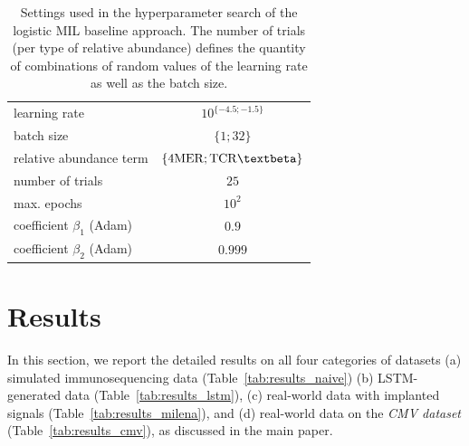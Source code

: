 \documentclass[oneside]{book}
\begin{document}
\begin{table}[htp]%
    \begin{center}%
        \begin{tabular}{lc}%
            \toprule
            learning rate & $10^{\{-4.5;-1.5\}}$ \\
            batch size & $\{1;32\}$ \\
            relative abundance term & $\{\mathrm{4MER}; \mathrm{TCR}\text{\textbeta}\}$ \\
            number of trials & $25$ \\
            max. epochs & $10^{2}$ \\
            coefficient $\beta_{1}$ (Adam) & $0.9$ \\
            coefficient $\beta_{2}$ (Adam) & $0.999$ \\
            \bottomrule
        \end{tabular}%
        \caption[Hyperparameter search of the logistic MIL baseline]{Settings used in the hyperparameter search of the logistic MIL baseline approach. 
        The number of trials (per type of relative abundance) defines the quantity of combinations of random values of the learning rate 
        as well as the batch size.}%
        \label{tab:mil_settings}%
    \end{center}%
\end{table}

%

\clearpage
\section{Results}
\label{sec:detailed_results}
In this section, we report the detailed results on all four categories 
of datasets (a) simulated immunosequencing data (Table~\ref{tab:results_naive})
(b) LSTM-generated data (Table~\ref{tab:results_lstm}),
(c) real-world data with implanted signals (Table~\ref{tab:results_milena}), 
and (d) real-world data on the \emph{CMV dataset} (Table~\ref{tab:results_cmv}),
as discussed in the main paper.
 

%

%

%



%



%



%
\end{document}
